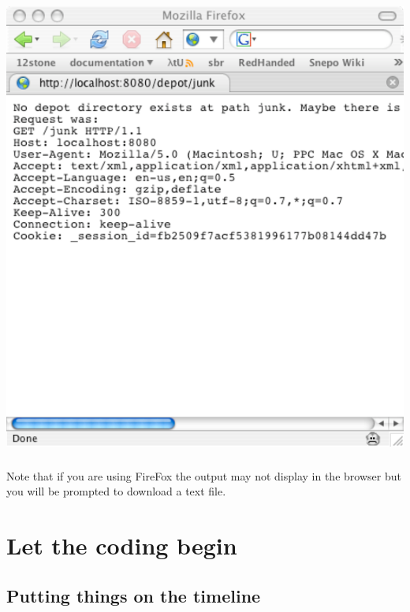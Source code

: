 \documentclass[12pt]{report}
\begin{document}
\begin{center}
\includegraphics[scale=0.7]{wiki-tutorial-images/wiki-screenshot-404.pdf}
\end{center} 

\paragraph{}
Note that if you are using FireFox the output may not display in the
browser but you will be prompted to download a text file. 
\pagebreak

\chapter{Let the coding begin}
\section{Putting things on the timeline}

\end{document}
